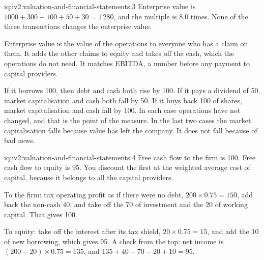 \begin{solution}{iq:iv2:valuation-and-financial-statements:3}
Enterprise value is $1000 + 300 - 100 + 50 + 30 = 1\,280$, and the multiple is 8.0 times. None of the three transactions changes the enterprise value.

Enterprise value is the value of the operations to everyone who has a claim on them. It adds the other claims to equity and takes off the cash, which the operations do not need. It matches EBITDA, a number before any payment to capital providers.

If it borrows 100, then debt and cash both rise by 100. If it pays a dividend of 50, market capitalisation and cash both fall by 50. If it buys back 100 of shares, market capitalisation and cash fall by 100. In each case operations have not changed, and that is the point of the measure. In the last two cases the market capitalisation falls because value has left the company. It does not fall because of bad news.

\end{solution}

\begin{solution}{iq:iv2:valuation-and-financial-statements:4}
Free cash flow to the firm is 100. Free cash flow to equity is 95. You discount the first at the weighted average cost of capital, because it belongs to all the capital providers.

To the firm: tax operating profit as if there were no debt, $200 \times 0.75 = 150$, add back the non-cash 40, and take off the 70 of investment and the 20 of working capital. That gives 100.

To equity: take off the interest after its tax shield, $20 \times 0.75 = 15$, and add the 10 of new borrowing, which gives 95. A check from the top: net income is $(200 - 20) \times 0.75 = 135$, and $135 + 40 - 70 - 20 + 10 = 95$.

\end{solution}

